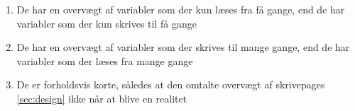 \begin{enumerate}
	\item De har en overvægt af variabler som der kun læses fra få gange, end de har variabler som der kun skrives til få gange
	\item De har en overvægt af variabler som der skrives til mange gange, end de har variabler som der læses fra mange gange
	\item De er forholdsvis korte, således at den omtalte overvægt af skrivepages \ref{sec:design} ikke når at blive en realitet
\end{enumerate}

